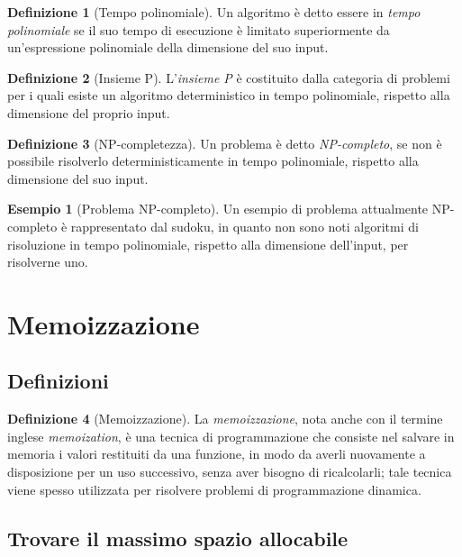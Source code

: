 \documentclass[14pt]{extreport}
\theoremstyle{definition}
\newtheorem{definition}{Definizione}[subsection]
\theoremstyle{definition}
\newtheorem{example}{Esempio}[subsection]
\begin{document}
\begin{definition}[Tempo polinomiale]
    Un algoritmo è detto essere in \textit{tempo polinomiale} se il suo tempo di esecuzione è limitato superiormente da un'espressione polinomiale della dimensione del suo input.
\end{definition}

\begin{definition}[Insieme P]
    L'\textit{insieme P} è costituito dalla categoria di problemi per i quali esiste un algoritmo deterministico in tempo polinomiale, rispetto alla dimensione del proprio input.
\end{definition}

\begin{definition}[NP-completezza]
    Un problema è detto \textit{NP-completo}, se non è possibile risolverlo deterministicamente in tempo polinomiale, rispetto alla dimensione del suo input.
\end{definition}

\begin{example}[Problema NP-completo]
    Un esempio di problema attualmente NP-completo è rappresentato dal sudoku, in quanto non sono noti algoritmi di risoluzione in tempo polinomiale, rispetto alla dimensione dell'input, per risolverne uno.
\end{example}

\section{Memoizzazione}

\subsection{Definizioni}

\begin{definition}[Memoizzazione]
    La \textit{memoizzazione}, nota anche con il termine inglese \textit{memoization}, è una tecnica di programmazione che consiste nel salvare in memoria i valori restituiti da una funzione, in modo da averli nuovamente a disposizione per un uso successivo, senza aver bisogno di ricalcolarli; tale tecnica viene spesso utilizzata per risolvere problemi di programmazione dinamica.
\end{definition}

\subsection{Trovare il massimo spazio allocabile}
\end{document}
